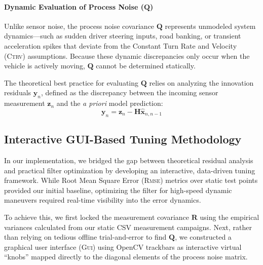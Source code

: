 \paragraph{Dynamic Evaluation of Process Noise ($\mathbf{Q}$)}
Unlike sensor noise, the process noise covariance $\mathbf{Q}$ represents unmodeled system dynamics—such as sudden driver steering inputs, road banking, or transient acceleration spikes that deviate from the Constant Turn Rate and Velocity (\textsc{Ctrv}) assumptions. Because these dynamic discrepancies only occur when the vehicle is actively moving, $\mathbf{Q}$ cannot be determined statically. 

The theoretical best practice for evaluating $\mathbf{Q}$ relies on analyzing the innovation residuals $\mathbf{y}_n$, defined as the discrepancy between the incoming sensor measurement $\mathbf{z}_n$ and the \emph{a priori} model prediction:%
\begin{equation}
	\mathbf{y}_n = \mathbf{z}_n - \mathbf{H} \hat{\mathbf{x}}_{n,n-1}
	\label{eq:innovation_residual}
\end{equation}

\subsection{Interactive GUI-Based Tuning Methodology}

In our implementation, we bridged the gap between theoretical residual analysis and practical filter optimization by developing an interactive, data-driven tuning framework. While Root Mean Square Error (\textsc{Rmse}) metrics over static test points provided our initial baseline, optimizing the filter for high-speed dynamic maneuvers required real-time visibility into the error dynamics.

To achieve this, we first locked the measurement covariance $\mathbf{R}$ using the empirical variances calculated from our static CSV measurement campaigns. Next, rather than relying on tedious offline trial-and-error to find $\mathbf{Q}$, we constructed a graphical user interface (\textsc{Gui}) using OpenCV trackbars as interactive virtual \enquote{knobs} mapped directly to the diagonal elements of the process noise matrix.

